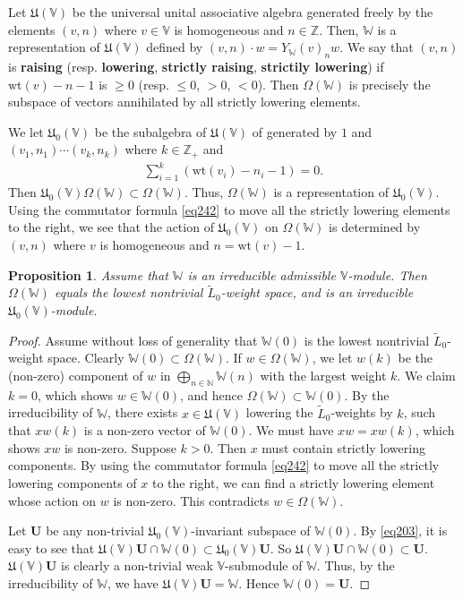 \documentclass[12pt,a4paper,notitlepage]{report}
\theoremstyle{definition}
\theoremstyle{plain}
\newtheorem{pp}[df]{Proposition}
\newcommand{\fk}{\mathfrak}
\newcommand{\wtd}{\widetilde}
\newcommand{\mbf}{\mathbf}
\newcommand{\Vbb}{\mathbb V}
\newcommand{\Wbb}{\mathbb W}
\newcommand{\Nbb}{\mathbb N}
\newcommand{\Zbb}{\mathbb Z}
\newcommand{\wt}{\mathrm{wt}}
\numberwithin{equation}{section}
\begin{document}
Let $\fk U(\Vbb)$ be the universal unital associative algebra generated freely by the elements $(v,n)$ where $v\in\Vbb$ is homogeneous and $n\in\Zbb$. \index{UV@$\fk U(\Vbb),\fk U_0(\Vbb)$} Then, $\Wbb$ is a representation of $\fk U(\Vbb)$ defined by $(v,n)\cdot w=Y_\Wbb(v)_nw$. We say that $(v,n)$ is \textbf{raising} (resp. \textbf{lowering}, \textbf{strictly raising}, \textbf{strictily lowering}) if $\wt(v)-n-1$ is $\geq 0$ (resp. $\leq 0$, $>0$, $<0$). Then $\Omega(\Wbb)$ is precisely the subspace of vectors annihilated by all strictly lowering elements.

We let $\fk U_0(\Vbb)$ be the subalgebra of $\fk U(\Vbb)$ of generated by $1$ and $(v_1,n_1)\cdots (v_k,n_k)$ where $k\in\Zbb_+$ and 
\begin{align*}
\sum_{i=1}^k (\wt(v_i)-n_i-1)=0.
\end{align*}
Then $\fk U_0(\Vbb)\Omega(\Wbb)\subset\Omega(\Wbb)$. Thus, $\Omega(\Wbb)$ is a representation of $\fk U_0(\Vbb)$. Using the commutator formula \eqref{eq242} to move all the strictly lowering elements to the right, we see that the action of $\fk U_0(\Vbb)$ on $\Omega(\Wbb)$ is determined by $(v,n)$ where $v$ is homogeneous and $n=\wt(v)-1$.

\begin{pp}\label{lb98}
Assume that $\Wbb$ is an irreducible admissible $\Vbb$-module. Then $\Omega(\Wbb)$ equals the lowest nontrivial $\wtd L_0$-weight space, and  is an irreducible $\fk U_0(\Vbb)$-module.
\end{pp}
\begin{proof}
Assume without loss of generality that $\Wbb(0)$ is the lowest nontrivial $\wtd L_0$-weight space. Clearly $\Wbb(0)\subset \Omega(\Wbb)$. If $w\in\Omega(\Wbb)$, we let $w(k)$ be the (non-zero) component of $w$ in $\bigoplus_{n\in\Nbb}\Wbb(n)$ with the largest weight $k$. We claim $k=0$, which shows $w\in\Wbb(0)$, and hence $\Omega(\Wbb)\subset\Wbb(0)$. By the irreducibility of $\Wbb$, there exists  $x\in\fk U(\Vbb)$ lowering the $\wtd L_0$-weights by $k$, such that $xw(k)$ is a non-zero vector of $\Wbb(0)$. We must have $xw=xw(k)$, which shows $xw$ is  non-zero.  Suppose $k>0$. Then $x$ must contain strictly lowering components. By using the commutator formula \eqref{eq242} to move all the strictly lowering components of $x$ to the right, we can find a strictly lowering element whose action on $w$ is non-zero. This contradicts $w\in\Omega(\Wbb)$.


Let $\mbf U$ be any non-trivial $\fk U_0(\Vbb)$-invariant subspace of $\Wbb(0)$. By \eqref{eq203}, it is easy to see that $\fk U(\Vbb)\mbf U\cap \Wbb(0)\subset\fk U_0(\Vbb)\mbf U$. So $\fk U(\Vbb)\mbf U\cap \Wbb(0)\subset\mbf U$. $\fk U(\Vbb)\mbf U$ is clearly a non-trivial weak $\Vbb$-submodule of $\Wbb$. Thus, by the irreducibility of $\Wbb$, we have $\fk U(\Vbb)\mbf U=\Wbb$. Hence $\Wbb(0)=\mbf U$. 
\end{proof}
\end{document}
